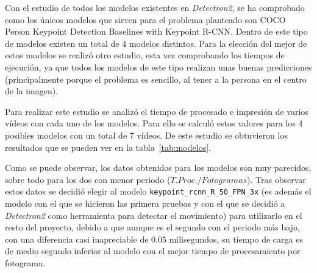 {Con el estudio de todos los modelos existentes en \textit{Detectron2}, se ha comprobado como los únicos modelos que sirven para el problema planteado son COCO Person Keypoint Detection Baselines with Keypoint R-CNN. Dentro de este tipo de modelos existen un total de 4 modelos distintos. Para la elección del mejor de estos modelos se realizó otro estudio, esta vez comprobando los tiempos de ejecución, ya que todos los modelos de este tipo realizan unas buenas predicciones (principalmente porque el problema es sencillo, al tener a la persona en el centro de la imagen).

Para realizar este estudio se analizó el tiempo de procesado e impresión de varios vídeos con cada uno de los modelos. Para ello se calculó estos valores para los 4 posibles modelos con un total de 7 vídeos. De este estudio se obtuvieron los resultados que se pueden ver en la tabla~\ref{tab:modelos}.

\begin{table}[h]
	\centering
\caption{Tabla con el estudio de los modelos de posición ordenado por ratio.}
\label{tab:modelos}
\end{table}

Como se puede observar, los datos obtenidos para los modelos son muy parecidos, sobre todo para los dos con menor periodo ($T. Proc./Fotogramas$). Tras observar estos datos se decidió elegir al modelo \texttt{keypoint\_rcnn\_R\_50\_FPN\_3x} (es además el modelo con el que se hicieron las primera pruebas y con el que se decidió a \textit{Detectron2} como herramienta para detectar el movimiento) para utilizarlo en el resto del proyecto, debido a que aunque es el segundo con el periodo más bajo, con una diferencia casi inapreciable de $0.05$ milisegundos, su tiempo de carga es de medio segundo inferior al modelo con el mejor tiempo de procesamiento por fotograma.

}
